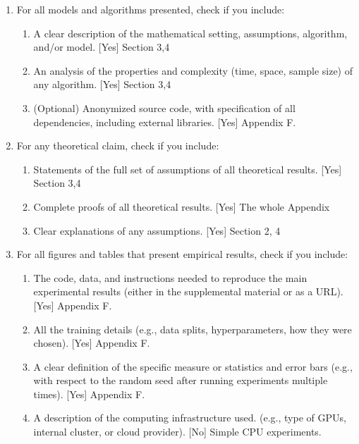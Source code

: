 \documentclass[twoside]{article}
\theoremstyle{plain}
\begin{document}
\begin{enumerate}

  \item For all models and algorithms presented, check if you include:
  \begin{enumerate}
    \item A clear description of the mathematical setting, assumptions, algorithm, and/or model. [Yes] Section 3,4
    \item An analysis of the properties and complexity (time, space, sample size) of any algorithm. [Yes] Section 3,4
    \item (Optional) Anonymized source code, with specification of all dependencies, including external libraries. [Yes] Appendix F.
  \end{enumerate}

  \item For any theoretical claim, check if you include:
  \begin{enumerate}
    \item Statements of the full set of assumptions of all theoretical results. [Yes] Section 3,4
    \item Complete proofs of all theoretical results. [Yes] The whole Appendix
    \item Clear explanations of any assumptions. [Yes] Section 2, 4
  \end{enumerate}

  \item For all figures and tables that present empirical results, check if you include:
  \begin{enumerate}
    \item The code, data, and instructions needed to reproduce the main experimental results (either in the supplemental material or as a URL). [Yes] Appendix F.
    \item All the training details (e.g., data splits, hyperparameters, how they were chosen). [Yes] Appendix F.
    \item A clear definition of the specific measure or statistics and error bars (e.g., with respect to the random seed after running experiments multiple times). [Yes] Appendix F.
    \item A description of the computing infrastructure used. (e.g., type of GPUs, internal cluster, or cloud provider). [No] Simple CPU experiments. 
  \end{enumerate}


\end{enumerate}
\end{document}
